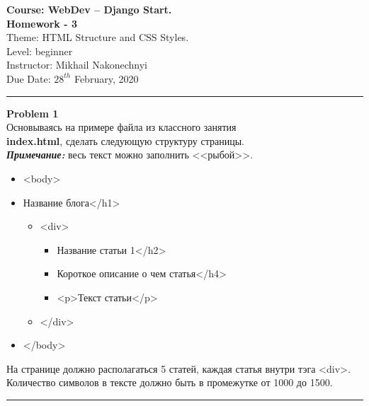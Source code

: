 \documentclass[a4paper, 11pt]{extarticle}
\newenvironment{problem}[2][Problem]
    { \begin{mdframed}[backgroundcolor=gray!20] \textbf{#1 #2} \\}
    {  \end{mdframed}}
\newenvironment{solution}
    {\textit{Solution:}}
    {}
\begin{document}

\noindent \LARGE{\textbf{Course: WebDev -- Django Start.}} \hfill  \\ 
\textbf{Homework - 3}  \hfill  \\

\noindent Theme: HTML Structure and CSS Styles. \hfill  \\
Level: beginner\\
Instructor: Mikhail Nakonechnyi \\
Due Date: $28^{th}$ February, 2020 \\
\noindent\rule{6.257in}{2.8pt}

\begin{problem}{1}
Основываясь на примере файла из классного занятия \\ \textbf{index.html}, сделать следующую структуру страницы. \\
\textit{\textbf{Примечание: }}весь текст можно заполнить <<рыбой>>. 
\begin{itemize}
\item <body>
\item <h1>Название блога</h1>
\begin{itemize}
\item <div>
\begin{itemize}
\item <h2>Название статьи 1</h2>
\item <h4>Короткое описание о чем статья</h4>
\item <p>Текст статьи</p>
\end{itemize}
\item </div>
\end{itemize}
\item </body>
\end{itemize}
На странице должно располагаться 5 статей, каждая статья внутри тэга <div>.
Количество символов в тексте должно быть в промежутке от 1000 до 1500.
\end{problem}
%
\noindent\rule{6.257in}{2.8pt}
\end{document}
